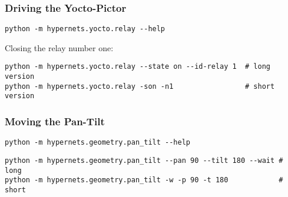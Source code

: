 \subsubsection{Driving the Yocto-Pictor}
\vspace{-16pt}
\begin{lstlisting}
python -m hypernets.yocto.relay --help
\end{lstlisting}
\vspace{-10pt}


\noindent Closing the relay number one:
\vspace{-10pt}
\begin{lstlisting}
python -m hypernets.yocto.relay --state on --id-relay 1  # long version
python -m hypernets.yocto.relay -son -n1                 # short version
\end{lstlisting}

\subsubsection{Moving the Pan-Tilt}
\vspace{-16pt}
\begin{lstlisting}
python -m hypernets.geometry.pan_tilt --help
\end{lstlisting}
\vspace{-10pt}

\begin{lstlisting}
python -m hypernets.geometry.pan_tilt --pan 90 --tilt 180 --wait # long
python -m hypernets.geometry.pan_tilt -w -p 90 -t 180            # short
\end{lstlisting}


